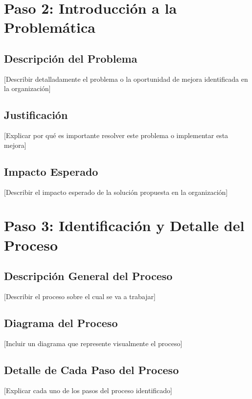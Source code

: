 \documentclass[12pt,letterpaper]{report}
\begin{document}
\section{Paso 2: Introducción a la Problemática}

\subsection{Descripción del Problema}
[Describir detalladamente el problema o la oportunidad de mejora identificada en la organización]

\subsection{Justificación}
[Explicar por qué es importante resolver este problema o implementar esta mejora]

\subsection{Impacto Esperado}
[Describir el impacto esperado de la solución propuesta en la organización]

\section{Paso 3: Identificación y Detalle del Proceso}

\subsection{Descripción General del Proceso}
[Describir el proceso sobre el cual se va a trabajar]

\subsection{Diagrama del Proceso}
[Incluir un diagrama que represente visualmente el proceso]

\subsection{Detalle de Cada Paso del Proceso}
[Explicar cada uno de los pasos del proceso identificado]
\end{document}
